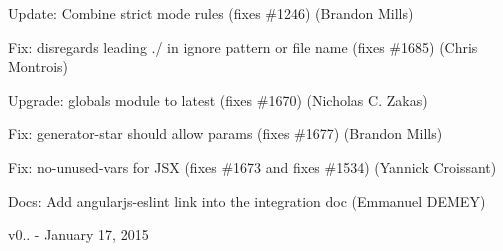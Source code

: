 \begin{DoxyItemize}
\item Update\+: Combine strict mode rules (fixes \#1246) (Brandon Mills)
\item Fix\+: disregards leading \textquotesingle{}./\textquotesingle{} in ignore pattern or file name (fixes \#1685) (Chris Montrois)
\item Upgrade\+: globals module to latest (fixes \#1670) (Nicholas C. Zakas)
\item Fix\+: generator-\/star should allow params (fixes \#1677) (Brandon Mills)
\item Fix\+: no-\/unused-\/vars for J\+SX (fixes \#1673 and fixes \#1534) (Yannick Croissant)
\item Docs\+: Add angularjs-\/eslint link into the integration doc (Emmanuel D\+E\+M\+EY)
\end{DoxyItemize}

v0.. -\/ January 17, 2015


